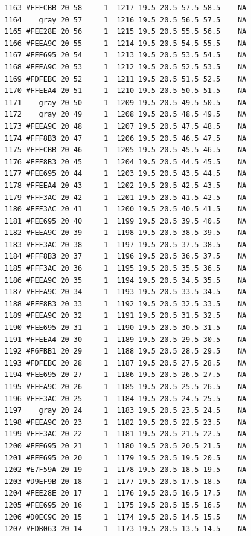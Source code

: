 \documentclass[12pt,twoside]{reedthesis}
\begin{document}
\begin{verbatim}
  1163 #FFFCBB 20 58     1  1217 19.5 20.5 57.5 58.5    NA
  1164    gray 20 57     1  1216 19.5 20.5 56.5 57.5    NA
  1165 #FEE28E 20 56     1  1215 19.5 20.5 55.5 56.5    NA
  1166 #FEEA9C 20 55     1  1214 19.5 20.5 54.5 55.5    NA
  1167 #FEE695 20 54     1  1213 19.5 20.5 53.5 54.5    NA
  1168 #FEEA9C 20 53     1  1212 19.5 20.5 52.5 53.5    NA
  1169 #FDFEBC 20 52     1  1211 19.5 20.5 51.5 52.5    NA
  1170 #FFEEA4 20 51     1  1210 19.5 20.5 50.5 51.5    NA
  1171    gray 20 50     1  1209 19.5 20.5 49.5 50.5    NA
  1172    gray 20 49     1  1208 19.5 20.5 48.5 49.5    NA
  1173 #FEEA9C 20 48     1  1207 19.5 20.5 47.5 48.5    NA
  1174 #FFF8B3 20 47     1  1206 19.5 20.5 46.5 47.5    NA
  1175 #FFFCBB 20 46     1  1205 19.5 20.5 45.5 46.5    NA
  1176 #FFF8B3 20 45     1  1204 19.5 20.5 44.5 45.5    NA
  1177 #FEE695 20 44     1  1203 19.5 20.5 43.5 44.5    NA
  1178 #FFEEA4 20 43     1  1202 19.5 20.5 42.5 43.5    NA
  1179 #FFF3AC 20 42     1  1201 19.5 20.5 41.5 42.5    NA
  1180 #FFF3AC 20 41     1  1200 19.5 20.5 40.5 41.5    NA
  1181 #FEE695 20 40     1  1199 19.5 20.5 39.5 40.5    NA
  1182 #FEEA9C 20 39     1  1198 19.5 20.5 38.5 39.5    NA
  1183 #FFF3AC 20 38     1  1197 19.5 20.5 37.5 38.5    NA
  1184 #FFF8B3 20 37     1  1196 19.5 20.5 36.5 37.5    NA
  1185 #FFF3AC 20 36     1  1195 19.5 20.5 35.5 36.5    NA
  1186 #FEEA9C 20 35     1  1194 19.5 20.5 34.5 35.5    NA
  1187 #FEEA9C 20 34     1  1193 19.5 20.5 33.5 34.5    NA
  1188 #FFF8B3 20 33     1  1192 19.5 20.5 32.5 33.5    NA
  1189 #FEEA9C 20 32     1  1191 19.5 20.5 31.5 32.5    NA
  1190 #FEE695 20 31     1  1190 19.5 20.5 30.5 31.5    NA
  1191 #FFEEA4 20 30     1  1189 19.5 20.5 29.5 30.5    NA
  1192 #F6FBB1 20 29     1  1188 19.5 20.5 28.5 29.5    NA
  1193 #FDFEBC 20 28     1  1187 19.5 20.5 27.5 28.5    NA
  1194 #FEE695 20 27     1  1186 19.5 20.5 26.5 27.5    NA
  1195 #FEEA9C 20 26     1  1185 19.5 20.5 25.5 26.5    NA
  1196 #FFF3AC 20 25     1  1184 19.5 20.5 24.5 25.5    NA
  1197    gray 20 24     1  1183 19.5 20.5 23.5 24.5    NA
  1198 #FEEA9C 20 23     1  1182 19.5 20.5 22.5 23.5    NA
  1199 #FFF3AC 20 22     1  1181 19.5 20.5 21.5 22.5    NA
  1200 #FEE695 20 21     1  1180 19.5 20.5 20.5 21.5    NA
  1201 #FEE695 20 20     1  1179 19.5 20.5 19.5 20.5    NA
  1202 #E7F59A 20 19     1  1178 19.5 20.5 18.5 19.5    NA
  1203 #D9EF9B 20 18     1  1177 19.5 20.5 17.5 18.5    NA
  1204 #FEE28E 20 17     1  1176 19.5 20.5 16.5 17.5    NA
  1205 #FEE695 20 16     1  1175 19.5 20.5 15.5 16.5    NA
  1206 #D0EC9C 20 15     1  1174 19.5 20.5 14.5 15.5    NA
  1207 #FDB063 20 14     1  1173 19.5 20.5 13.5 14.5    NA

\end{verbatim}
\end{document}
